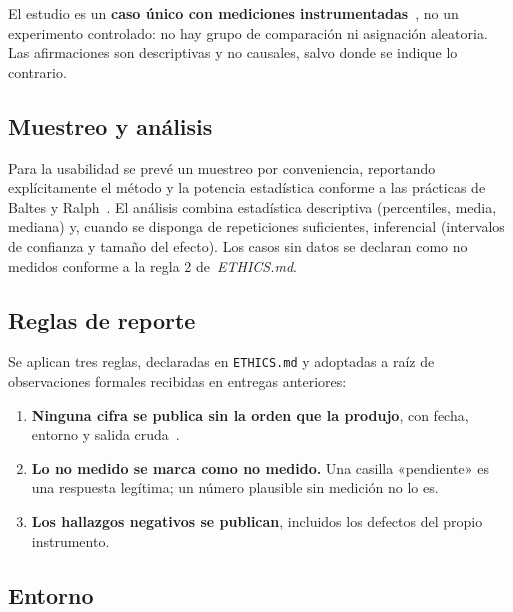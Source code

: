 \documentclass[11pt,a4paper]{article}
\begin{document}
El estudio es un \textbf{caso único con mediciones
instrumentadas}~\cite{runeson2009guidelines}, no un experimento controlado: no
hay grupo de comparación ni asignación aleatoria. Las afirmaciones son
descriptivas y no causales, salvo donde se indique lo contrario.

\subsection{Muestreo y análisis}

Para la usabilidad se prevé un muestreo por conveniencia, reportando
explícitamente el método y la potencia estadística conforme a las prácticas de
Baltes y Ralph~\cite{baltes2022sampling}. El análisis combina estadística
descriptiva (percentiles, media, mediana) y, cuando se disponga de repeticiones
suficientes, inferencial (intervalos de confianza y tamaño del efecto). Los casos
sin datos se declaran como no medidos conforme a la regla 2 de~\textit{ETHICS.md}.

\subsection{Reglas de reporte}

Se aplican tres reglas, declaradas en \texttt{ETHICS.md} y adoptadas a raíz de
observaciones formales recibidas en entregas anteriores:

\begin{enumerate}[leftmargin=*]
  \item \textbf{Ninguna cifra se publica sin la orden que la produjo}, con fecha,
        entorno y salida cruda~\cite{sandve2013ten}.
  \item \textbf{Lo no medido se marca como no medido.} Una casilla «pendiente» es
        una respuesta legítima; un número plausible sin medición no lo es.
  \item \textbf{Los hallazgos negativos se publican}, incluidos los defectos del
        propio instrumento.
\end{enumerate}

\subsection{Entorno}
\end{document}
